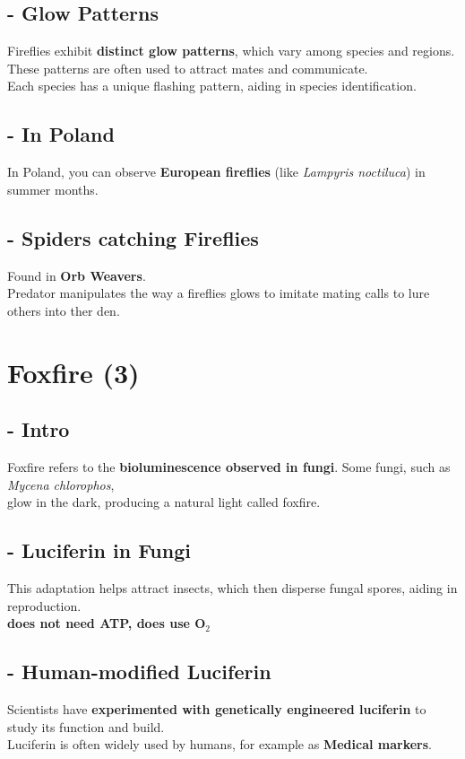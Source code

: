 \documentclass{article}
\begin{document}
\subsection*{- Glow Patterns }
Fireflies exhibit \textbf{distinct glow patterns}, which vary among species and regions.\\ 
These patterns are often used to attract mates and communicate.\\ 
Each species has a unique flashing pattern, aiding in species identification.

\subsection*{- In Poland }
In Poland, you can observe \textbf{European fireflies} (like \textit{Lampyris noctiluca}) in summer months.

\subsection*{- Spiders catching Fireflies }
Found in \textbf{Orb Weavers}.\\
Predator manipulates the way a fireflies glows to imitate mating calls to lure others into ther den.


\section*{Foxfire (3)}

\subsection*{- Intro }
Foxfire refers to the \textbf{bioluminescence observed in fungi}. Some fungi, such as \textit{Mycena chlorophos},\\ 
glow in the dark, producing a natural light called foxfire.

\subsection*{- Luciferin in Fungi }
This adaptation helps attract insects, which then disperse fungal spores, aiding in reproduction.\\
\textbf{does not need ATP, does use O$_2$}


\subsection*{- Human-modified Luciferin }
Scientists have \textbf{experimented with genetically engineered luciferin} to study its function and build.\\
Luciferin is often widely used by humans, for example as \textbf{Medical markers}.
\end{document}
